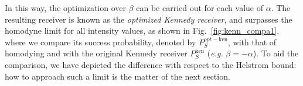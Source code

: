 In this way, the optimization over $\beta$ can be carried out for each value of $\alpha$. The resulting receiver is known as the \textit{optimized Kennedy receiver}, and surpasses the homodyne limit for all intensity values, as shown in Fig.~\ref{fig:kenn_compa1}, where we compare its success probability, denoted by $P_S^{opt-\text{ken}}$, with that of homodying and with the original Kennedy receiver $P_S^{\text{ken}}$ (\textit{e.g.} $\beta = -\alpha$). To aid the comparison, we have depicted the difference with respect to the Helstrom bound: how to approach such a limit is the matter of the next section.

%
